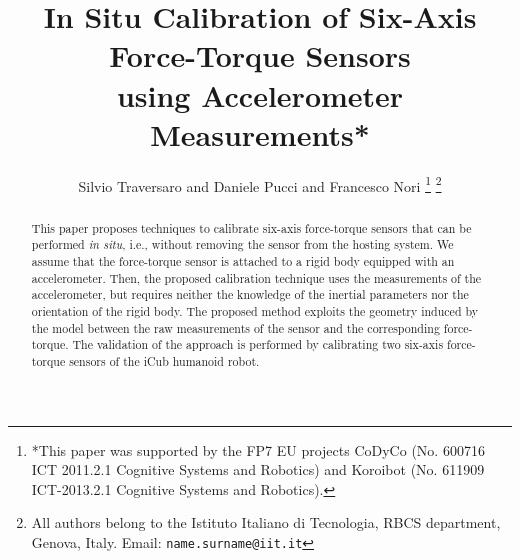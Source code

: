 \documentclass[letterpaper, 10 pt, conference]{ieeeconf}  %
\title{\LARGE \bf
In Situ Calibration of Six-Axis Force-Torque Sensors \\ using Accelerometer Measurements*
}
\author{Silvio Traversaro and Daniele Pucci and Francesco Nori%
\thanks{*This paper was supported by the FP7 EU projects CoDyCo (No. 600716
ICT 2011.2.1 Cognitive Systems and Robotics) and Koroibot (No. 611909
ICT-2013.2.1 Cognitive Systems and Robotics).}%
\thanks{All authors belong to the Istituto Italiano di Tecnologia, RBCS department, Genova, Italy. Email: {\tt\small name.surname@iit.it}}%
}
\begin{document}
\newcommand{\prop}[2]{\textbf{Proposition #1. }\textit{#2}}
\newcommand{\remark}[2]{\textbf{Remark #1. }\textit{#2}}
\newcommand{\lemma}[2]{\textbf{Lemma #1. }\textit{#2}}
\newcommand{\hp}[2]{\textbf{Assumption #1. }\textit{#2}}
\newcommand{\nrofsg}{6}
\newcommand{\calibmat}{\mathbf{C}}
\newcommand{\shapemat}{\mathbf{S}}
\newcommand{\rawval}{\mathbf{r}}
\newcommand{\senswrench}{{}^s\mathbf{w}}
\newcommand{\sensgrav}{{}^s\mathbf{g}}
\newcommand{\offsetwrench}{{}^\mathbf{o_w}}
\newcommand{\offsetraw}{\mathbf{o_r}}

\maketitle
\thispagestyle{empty}
\pagestyle{empty}

\newtheorem{hypothesis}{Assumption}

\begin{abstract}
This paper proposes techniques to calibrate six-axis force-torque sensors that can be performed \emph{in situ}, i.e., without removing the sensor from
the hosting 
system. 
We assume that the force-torque sensor is attached to a rigid body equipped with an accelerometer. Then, the proposed calibration 
technique uses the measurements of the accelerometer, but
requires neither the knowledge of the inertial parameters 
nor the orientation
of the rigid body. 
The proposed method exploits the geometry induced by the model between the raw measurements of the 
sensor and the corresponding force-torque. 
The validation of the approach is performed by calibrating two six-axis force-torque sensors of the iCub humanoid 
robot.
\end{abstract}


















\end{document}

